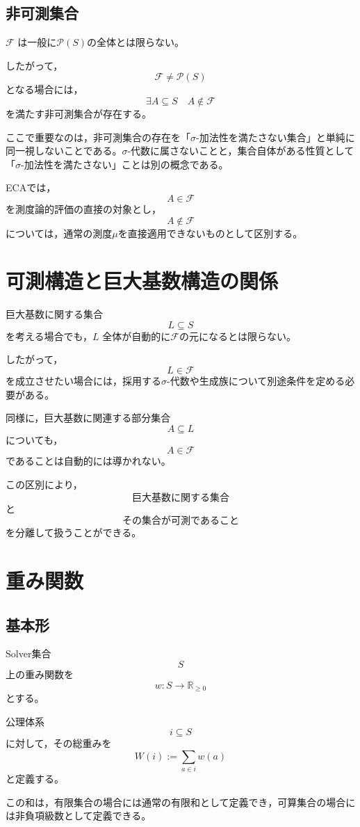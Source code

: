 \documentclass[12pt,a4paper]{article}
\begin{document}
\subsection{非可測集合}

$\mathcal F$ は一般に$\mathcal P(S)$の全体とは限らない。

したがって，
\[
\mathcal F\neq\mathcal P(S)
\]
となる場合には，
\[
\exists A\subseteq S
\quad
A\notin\mathcal F
\]
を満たす非可測集合が存在する。

ここで重要なのは，非可測集合の存在を「$\sigma$-加法性を満たさない集合」と単純に同一視しないことである。$\sigma$-代数に属さないことと，集合自体がある性質として「$\sigma$-加法性を満たさない」ことは別の概念である。

ECAでは，
\[
A\in\mathcal F
\]
を測度論的評価の直接の対象とし，
\[
A\notin\mathcal F
\]
については，通常の測度$\mu$を直接適用できないものとして区別する。

\section{可測構造と巨大基数構造の関係}

巨大基数に関する集合
\[
L\subseteq S
\]
を考える場合でも，$L$ 全体が自動的に$\mathcal F$の元になるとは限らない。

したがって，
\[
L\in\mathcal F
\]
を成立させたい場合には，採用する$\sigma$-代数や生成族について別途条件を定める必要がある。

同様に，巨大基数に関連する部分集合
\[
A\subseteq L
\]
についても，
\[
A\in\mathcal F
\]
であることは自動的には導かれない。

この区別により，
\[
\text{巨大基数に関する集合}
\]
と
\[
\text{その集合が可測であること}
\]
を分離して扱うことができる。

\section{重み関数}

\subsection{基本形}

Solver集合
\[
S
\]
上の重み関数を
\[
w:S\to\mathbb R_{\geq0}
\]
とする。

公理体系
\[
i\subseteq S
\]
に対して，その総重みを
\[
W(i):=\sum_{a\in i}w(a)
\]
と定義する。

この和は，有限集合の場合には通常の有限和として定義でき，可算集合の場合には非負項級数として定義できる。
\end{document}
